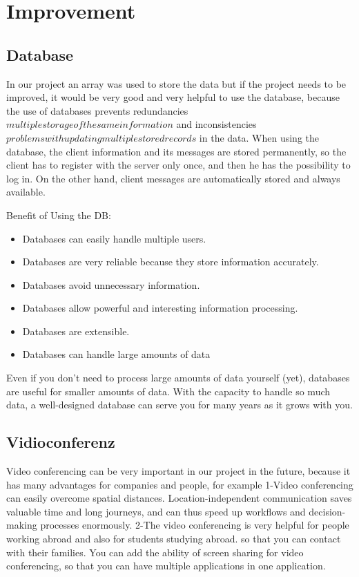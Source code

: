 \chapter{Improvement}\label{ch:improvement}


\section{Database}\label{sec:database}
In our project an array was used to store the data
but if the project needs to be improved, it would be very good and very helpful to use the database,
because the use of databases prevents redundancies \(multiple storage of the same information\) and
inconsistencies \(problems with updating multiple stored records\) in the data.
When using the database, the client information and its messages are stored permanently, so the
client has to register with the server only once, and then he has the possibility to log in.
On the other hand, client messages are automatically stored and always available.

Benefit of Using the DB:
\begin{itemize}
    \item Databases can easily handle multiple users.
    \item Databases are very reliable because they store information accurately.
    \item Databases avoid unnecessary information.
    \item Databases allow powerful and interesting information processing.
    \item Databases are extensible.
    \item Databases can handle large amounts of data
\end{itemize}
\noindent
Even if you don't need to process large amounts of data yourself (yet), databases are useful for
smaller amounts of data. With the capacity to handle so much data, a well-designed database can
serve you for many years as it grows with you.

\section {Vidioconferenz }\label{sec:Vidioconferenz}
Video conferencing can be very important in our project in the future, because it has many advantages
 for companies and people, for example 
1-Video conferencing can easily overcome spatial distances. Location-independent communication
saves valuable time and long journeys, and can thus speed up workflows and decision-making processes
enormously.
2-The video conferencing is very helpful for people working abroad and also for students studying abroad.
so that you can contact with their families. 
You can add the ability of screen sharing for video conferencing, so that you can have multiple applications
in one application.


